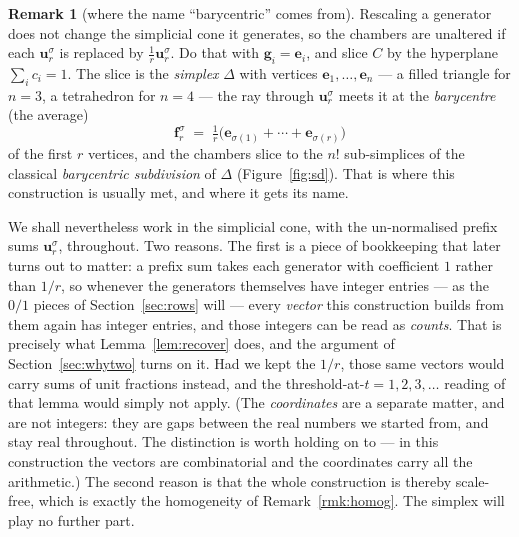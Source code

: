 \documentclass[11pt,a4paper]{article}
\theoremstyle{definition}
\newtheorem{remark}[definition]{Remark}
\theoremstyle{plain}
\newcommand{\bvec}[1]{\mathbf{#1}}
\begin{document}
\begin{remark}[where the name ``barycentric'' comes from]\label{rmk:whybary}
Rescaling a generator does not change the simplicial cone it generates, so the
chambers are unaltered if each $\bvec u^\sigma_r$ is replaced by $\tfrac1r\bvec
u^\sigma_r$. Do that with $\bvec g_i=\bvec e_i$, and slice $C$ by the hyperplane
$\sum_i c_i=1$. The slice is the \emph{simplex} $\Delta$ with vertices $\bvec
e_1,\dots,\bvec e_n$ --- a filled triangle for $n=3$, a tetrahedron for $n=4$
--- the ray through $\bvec u^\sigma_r$ meets it at the \emph{barycentre} (the
average)
\[
   \bvec f^\sigma_r \;=\; \tfrac1r\bigl(\bvec e_{\sigma(1)}+\cdots
                            +\bvec e_{\sigma(r)}\bigr)
\]
of the first $r$ vertices, and the chambers slice to the $n!$ sub-simplices of
the classical \emph{barycentric subdivision} of $\Delta$
(Figure~\ref{fig:sd}). That is where this construction is usually met, and
where it gets its name.

We shall nevertheless work in the simplicial cone, with the un-normalised
prefix sums $\bvec u^\sigma_r$, throughout. Two reasons. The first is a piece
of bookkeeping that later turns out to matter: a prefix sum takes each
generator with coefficient $1$ rather than $1/r$, so whenever the generators
themselves have integer entries --- as the $0/1$ pieces of
Section~\ref{sec:rows} will --- every \emph{vector} this construction builds
from them again has integer entries, and those integers can be read as
\emph{counts}. That is precisely what Lemma~\ref{lem:recover} does, and the
argument of Section~\ref{sec:whytwo} turns on it. Had we kept the $1/r$, those
same vectors would carry sums of unit fractions instead, and the
threshold-at-$t=1,2,3,\dots$ reading of that lemma would simply not apply. (The \emph{coordinates} are a separate matter, and are not integers: they
are gaps between the real numbers we started from, and stay real throughout.
The distinction is worth holding on to --- in this construction the vectors are
combinatorial and the coordinates carry all the arithmetic.) The second reason
is that the whole construction is thereby scale-free, which is exactly the
homogeneity of Remark~\ref{rmk:homog}. The simplex will play no further part.
\end{remark}
\end{document}
